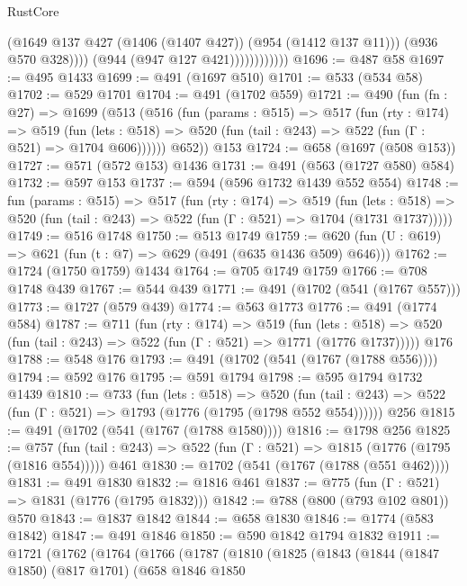 \begin{lexlean}{RustCore}
\begin{coremodule}
                              (@1649 @137 @427 (@1406 (@1407 @427)) (@954 (@1412 @137 @11)))
                              (@936 @570 @328))))
                        (@944 (@947 @127 @421))))))))))))
@1696 := @487 @58
@1697 := @495 @1433
@1699 := @491 (@1697 @510)
@1701 := @533 (@534 @58)
@1702 := @529 @1701
@1704 := @491 (@1702 @559)
@1721 := @490
    (fun (fn : @27) =>
    @1699
      (@513
        (@516
          (fun (params : @515) =>
          @517
            (fun (rty : @174) =>
            @519
              (fun (lets : @518) =>
              @520 (fun (tail : @243) => @522 (fun (Γ : @521) => @1704 @606))))))
        @652))
    @153
@1724 := @658 (@1697 (@508 @153))
@1727 := @571 (@572 @153) @1436
@1731 := @491 (@563 (@1727 @580) @584)
@1732 := @597 @153
@1737 := @594 (@596 @1732 @1439 @552 @554)
@1748 := fun (params : @515) =>
  @517
    (fun (rty : @174) =>
    @519
      (fun (lets : @518) =>
      @520 (fun (tail : @243) => @522 (fun (Γ : @521) => @1704 (@1731 @1737)))))
@1749 := @516 @1748
@1750 := @513 @1749
@1759 := @620 (fun (U : @619) => @621 (fun (t : @7) => @629 (@491 (@635 @1436 @509) @646)))
@1762 := @1724 (@1750 @1759) @1434
@1764 := @705 @1749 @1759
@1766 := @708 @1748 @439
@1767 := @544 @439
@1771 := @491 (@1702 (@541 (@1767 @557)))
@1773 := @1727 (@579 @439)
@1774 := @563 @1773
@1776 := @491 (@1774 @584)
@1787 := @711
    (fun (rty : @174) =>
    @519
      (fun (lets : @518) =>
      @520 (fun (tail : @243) => @522 (fun (Γ : @521) => @1771 (@1776 @1737)))))
    @176
@1788 := @548 @176
@1793 := @491 (@1702 (@541 (@1767 (@1788 @556))))
@1794 := @592 @176
@1795 := @591 @1794
@1798 := @595 @1794 @1732 @1439
@1810 := @733
    (fun (lets : @518) =>
    @520 (fun (tail : @243) => @522 (fun (Γ : @521) => @1793 (@1776 (@1795 (@1798 @552 @554))))))
    @256
@1815 := @491 (@1702 (@541 (@1767 (@1788 @1580))))
@1816 := @1798 @256
@1825 := @757
    (fun (tail : @243) => @522 (fun (Γ : @521) => @1815 (@1776 (@1795 (@1816 @554)))))
    @461
@1830 := @1702 (@541 (@1767 (@1788 (@551 @462))))
@1831 := @491 @1830
@1832 := @1816 @461
@1837 := @775 (fun (Γ : @521) => @1831 (@1776 (@1795 @1832)))
@1842 := @788 (@800 (@793 @102 @801)) @570
@1843 := @1837 @1842
@1844 := @658 @1830
@1846 := @1774 (@583 @1842)
@1847 := @491 @1846
@1850 := @590 @1842 @1794 @1832
@1911 := @1721
    (@1762
      (@1764
        (@1766
          (@1787
            (@1810
              (@1825
                (@1843
                  (@1844
                    (@1847 @1850)
                    (@817 @1701)
                    (@658
                      @1846
                      @1850

\end{coremodule}
\end{lexlean}
